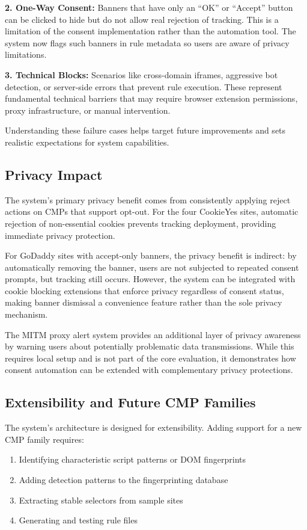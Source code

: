 \documentclass[conference]{IEEEtran}
\begin{document}
\textbf{2. One-Way Consent:} Banners that have only an ``OK'' or ``Accept'' button can be clicked to hide but do not allow real rejection of tracking. This is a limitation of the consent implementation rather than the automation tool. The system now flags such banners in rule metadata so users are aware of privacy limitations.

\textbf{3. Technical Blocks:} Scenarios like cross-domain iframes, aggressive bot detection, or server-side errors that prevent rule execution. These represent fundamental technical barriers that may require browser extension permissions, proxy infrastructure, or manual intervention.

Understanding these failure cases helps target future improvements and sets realistic expectations for system capabilities.

\subsection{Privacy Impact}

The system's primary privacy benefit comes from consistently applying reject actions on CMPs that support opt-out. For the four CookieYes sites, automatic rejection of non-essential cookies prevents tracking deployment, providing immediate privacy protection.

For GoDaddy sites with accept-only banners, the privacy benefit is indirect: by automatically removing the banner, users are not subjected to repeated consent prompts, but tracking still occurs. However, the system can be integrated with cookie blocking extensions that enforce privacy regardless of consent status, making banner dismissal a convenience feature rather than the sole privacy mechanism.

The MITM proxy alert system provides an additional layer of privacy awareness by warning users about potentially problematic data transmissions. While this requires local setup and is not part of the core evaluation, it demonstrates how consent automation can be extended with complementary privacy protections.

\subsection{Extensibility and Future CMP Families}

The system's architecture is designed for extensibility. Adding support for a new CMP family requires:

\begin{enumerate}

    \item Identifying characteristic script patterns or DOM fingerprints

    \item Adding detection patterns to the fingerprinting database

    \item Extracting stable selectors from sample sites

    \item Generating and testing rule files

\end{enumerate}
\end{document}
